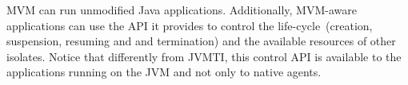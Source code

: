 MVM can run unmodified Java applications. Additionally, MVM-aware applications can use the API it provides to control the life-cycle~(\eg creation, suspension, resuming and and termination) and the available resources of other isolates. Notice that differently from JVMTI, this control API is available to the applications running on the JVM and not only to native agents.


